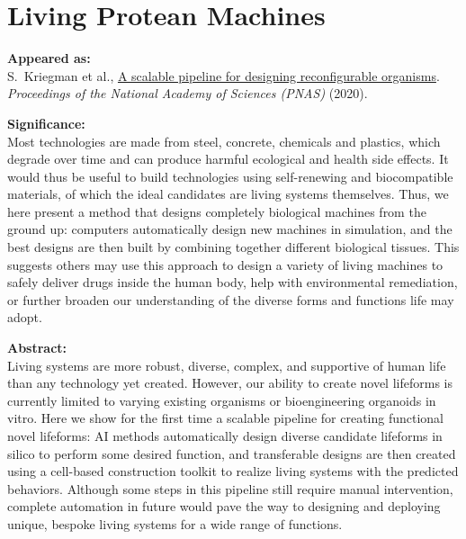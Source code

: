 


\chapter{Living Protean Machines}



\textbf{Appeared as:}\\
S.~Kriegman et al., \href{https://www.pnas.org/content/117/4/1853}{\color{blue}A scalable pipeline for designing reconfigurable organisms}. 
\textit{Proceedings of the National Academy of Sciences (PNAS)} (2020).

\vspace{1.5em}

\noindent
\textbf{Significance:}\\
\noindent
Most technologies are made from steel, concrete, chemicals and plastics, which degrade over time and can produce harmful ecological and health side effects. It would thus be useful to build technologies using self-renewing and biocompatible materials, of which the ideal candidates are living systems themselves. Thus, we here present a method that designs completely biological machines from the ground up: computers automatically design new machines in simulation, and the best designs are then built by combining together different biological tissues. This suggests others may use this approach to design a variety of living machines to safely deliver drugs inside the human body, help with environmental remediation, or further broaden our understanding of the diverse forms and functions life may adopt.

\vspace{1.5em}

\noindent
\textbf{Abstract:}\\
\noindent
Living systems are more robust, diverse, complex, and supportive of human life than any technology yet created. However, our ability to create novel lifeforms is currently limited to varying existing organisms or bioengineering organoids in vitro. Here we show for the first time a scalable pipeline for creating functional novel lifeforms: AI methods automatically design diverse candidate lifeforms in silico to perform some desired function, and transferable designs are then created using a cell-based construction toolkit to realize living systems with the predicted behaviors. Although some steps in this pipeline still require manual intervention, complete automation in future would pave the way to designing and deploying unique, bespoke living systems for a wide range of functions.



